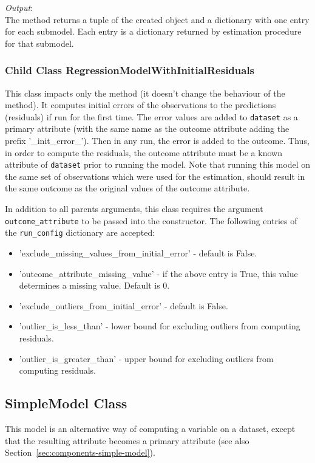 {\it Output}:~\\[1mm]
The method returns a tuple of the created  object and a
dictionary with one entry for each submodel. 
Each entry is a dictionary returned by estimation procedure for that submodel.

\subsubsection{Child Class RegressionModelWithInitialResiduals}
\label{page:regression-model-with-initial-residuals}
%
This class impacts only the method  (it doesn't change the behaviour of the  method).
It computes initial errors of the observations to the predictions (residuals)
if run for the first time. The error values are added to \verb|dataset| as a primary attribute 
(with the same name as the outcome attribute adding the prefix '_init_error_').
Then in any run, the error is added to the outcome. Thus, in order to compute the residuals,
the outcome attribute must be a known attribute of \verb|dataset| prior to running the model.
Note that running this model on the same set of observations which were used for the estimation,
should result in the same outcome as the original values of the outcome attribute.

In addition to all parents arguments, this class requires the argument \verb|outcome_attribute|
to be passed into the constructor. The following entries of the \verb|run_config| dictionary are accepted:
\begin{itemize}
\item 'exclude_missing_values_from_initial_error' - default is False.
\item 'outcome_attribute_missing_value' - if the above entry is True, this value determines a missing value. Default is 0.
\item 'exclude_outliers_from_initial_error' - default is False.
\item 'outlier_is_less_than' - lower bound for excluding outliers from computing residuals.
\item 'outlier_is_greater_than' - upper bound for excluding outliers from computing residuals.
\end{itemize}

\subsection{SimpleModel Class}
\label{sec:api-simple-model}
%
This model is an alternative way of computing a variable on a dataset, except that the resulting attribute 
becomes a primary attribute (see also Section~\ref{sec:components-simple-model}).

